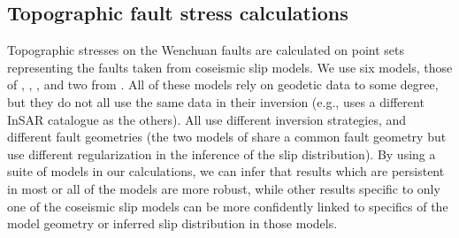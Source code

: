 \documentclass[draft,jgrga]{AGUTeX}
\begin{document}
\begin{article}

\subsection{Topographic fault stress
calculations}\label{topographic-fault-stress-calculations}

Topographic stresses on the Wenchuan faults are calculated on point sets
representing the faults taken from coseismic slip models. We use six models,
those of \citet{shen2009}, \citet{feng2010}, \citet{zhang2011},
\citet{fielding2013} and two from \citet{qi2011}.
All of these models rely on geodetic data to some degree, but they do not all 
use the same data in their inversion (e.g., \citep{feng2010} uses a different
InSAR catalogue as the others). All use different inversion strategies, and
different fault geometries (the two models of \citep{qi2011} share a common
fault geometry but use different regularization in the inference of the slip
distribution). By using a suite of models in our calculations, we can infer
that results which are persistent in most or all of the models are more robust,
while other results specific to only one of the coseismic slip models can be
more confidently linked to specifics of the model geometry or inferred slip
distribution in those models. 


\end{article}
\end{document}
